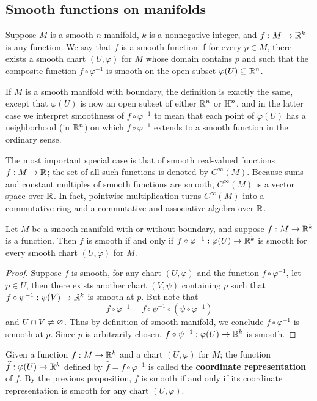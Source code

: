 \subsection{Smooth functions on manifolds}
Suppose $M$ is a smooth $n$-manifold, $k$ is a nonnegative integer, and $f:M\to\mathbb{R}^k$ is any function. We say that $f$ is a smooth function if for every $p\in M$, there exists a smooth chart $(U,\varphi)$ for $M$ whose domain contains $p$ and such that the composite function $f\circ\varphi^{-1}$ is smooth on the open subset $\varphi(U)\subseteq\mathbb{R}^n$.\par If $M$ is a smooth manifold with boundary, the definition is exactly the same, except that $\varphi(U)$ is now an open subset of either $\mathbb{R}^n$ or $\mathbb{H}^n$, and in the latter case we interpret smoothness of $f\circ\varphi^{-1}$ to mean that each point of $\varphi(U)$ has a neighborhood (in $\mathbb{R}^n$) on which $f\circ\varphi^{-1}$ extends to a smooth function in the ordinary sense.\par
The most important special case is that of smooth real-valued functions $f:M\to\mathbb{R}$; the set of all such functions is denoted by $C^\infty(M)$. Because sums and constant multiples of smooth functions are smooth, $C^\infty(M)$ is a vector space over $\mathbb{R}$. In fact, pointwise multiplication turns $C^\infty(M)$ into a commutative ring and a commutative and associative algebra over $\mathbb{R}$.
\begin{proposition}
Let $M$ be a smooth manifold with or without boundary, and suppose $f:M\to\mathbb{R}^k$ is a function. Then $f$ is smooth if and only if $f\circ\varphi^{-1}:\varphi(U)\to\mathbb{R}^k$ is smooth for every smooth chart $(U,\varphi)$ for $M$.
\end{proposition}
\begin{proof}
Suppose $f$ is smooth, for any chart $(U,\varphi)$ and the function $f\circ\varphi^{-1}$, let $p\in U$, then there exists another chart $(V,\psi)$ containing $p$ such that $f\circ\psi^{-1}:\psi(V)\to\mathbb{R}^k$ is smooth at $p$. But note that
\[f\circ\varphi^{-1}=f\circ\psi^{-1}\circ(\psi\circ\varphi^{-1})\]
and $U\cap V\neq\varnothing$. Thus by definition of smooth manifold, we conclude $f\circ\varphi^{-1}$ is smooth at $p$. Since $p$ is arbitrarily chosen, $f\circ\psi^{-1}:\varphi(U)\to\mathbb{R}^k$ is smooth.
\end{proof}
Given a function $f:M\to\mathbb{R}^k$ and a chart $(U,\varphi)$ for $M$; the function $\widehat{f}:\varphi(U)\to\mathbb{R}^k$ defined by $\widehat{f}=f\circ\varphi^{-1}$ is called the \textbf{coordinate representation} of $f$. By the previous proposition, $f$ is smooth if and only if its coordinate representation is smooth for any chart $(U,\varphi)$.
